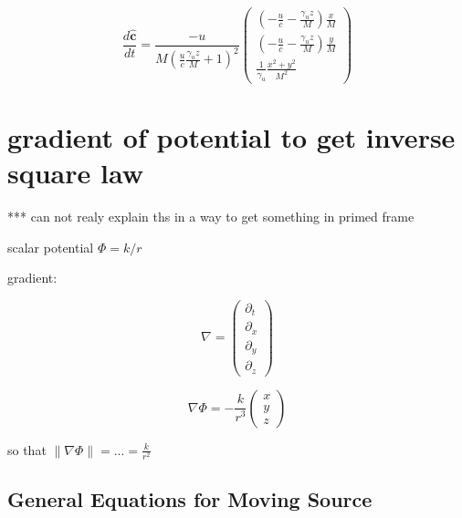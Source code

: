 \begin{equation}
	\frac{d\mathbf{\hat{c}}}{dt} = \frac{-u}{M (  \frac{u}{c} \frac{\gamma_u z}{M} +  1 )^2}
	\begin{pmatrix}
		( - \frac{u}{c}  - \frac{ \gamma_u z }{M} ) \frac{x}{M} \\
		( - \frac{u}{c}  - \frac{\gamma_u z }{M} ) \frac{y}{M} \\
		 \frac{1}{\gamma_u}\frac{ x^2 + y^2 }{M^2}
	\end{pmatrix}
\end{equation}

\section{gradient of potential to get inverse square law}\label{sect: gradient of potential to get inverse square law}

*** can not realy explain ths in a way to get something in primed frame

scalar potential $ \Phi = k/r$

gradient:

\begin{equation}
	\nabla = \begin{pmatrix}
		\partial_t \\
		\partial_x \\
		\partial_y \\
		\partial_z
	\end{pmatrix}
\end{equation}

\begin{equation}
	\nabla \Phi = -\frac{k}{r^3} \begin{pmatrix}
		x \\ y \\ z
	\end{pmatrix}
\end{equation}

so that $\|\nabla\Phi\|= ... = \frac{k}{r^2}$

\subsection{General Equations for Moving Source}\label{subsubsect: General Equations for Moving Source 1}

